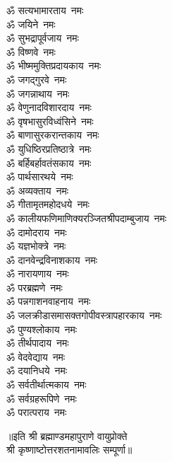 \begin{multicols}{2}
\begin{flushleft}
ॐ सत्यभामारताय~नमः\\
ॐ जयिने~नमः\hfill{}\\
ॐ सुभद्रापूर्वजाय~नमः\\
ॐ विष्णवे~नमः\\
ॐ भीष्ममुक्तिप्रदायकाय~नमः\\
ॐ जगद्गुरवे~नमः\\
ॐ जगन्नाथाय~नमः\\
ॐ वेणुनादविशारदाय~नमः\\
ॐ वृषभासुरविध्वंसिने~नमः\\
ॐ बाणासुरकरान्तकाय~नमः\\
ॐ युधिष्ठिरप्रतिष्ठात्रे~नमः\\
ॐ बर्हिबर्हावतंसकाय~नमः\hfill{}\\
ॐ पार्थसारथये~नमः\\
ॐ अव्यक्ताय~नमः\\
ॐ गीतामृतमहोदधये~नमः\\
ॐ कालीयफणिमाणिक्य\-रञ्जित\-श्री\-पदाम्बुजाय~नमः\\
ॐ दामोदराय~नमः\\
ॐ यज्ञभोक्त्रे~नमः\\
ॐ दानवेन्द्रविनाशकाय~नमः\\
ॐ नारायणाय~नमः\\
ॐ परब्रह्मणे~नमः\\
ॐ पन्नगाशनवाहनाय~नमः\hfill{}\\
ॐ जलक्रीडासमासक्त\-गोपी\-वस्त्रापहारकाय~नमः\\
ॐ पुण्यश्लोकाय~नमः\\
ॐ तीर्थपादाय~नमः\\
ॐ वेदवेद्याय~नमः\\
ॐ दयानिधये~नमः\\
ॐ सर्वतीर्थात्मकाय~नमः\\
ॐ सर्वग्रहरूपिणे~नमः\\
ॐ परात्पराय~नमः\\
\end{flushleft}
\end{multicols}
॥इति श्री ब्रह्माण्डमहापुराणे वायुप्रोक्ते\\श्री कृष्णाष्टोत्तरशतनामावलिः सम्पूर्णा॥
